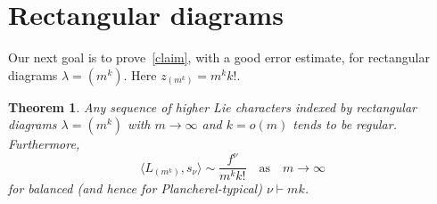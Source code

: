 \documentclass[12pt]%
{amsart}
\newcommand{\la}{{\lambda}}
\newcommand{\al}{{\alpha}}
\theoremstyle{plain}
\newtheorem{theorem}{Theorem}[section]
\theoremstyle{definition}
\theoremstyle{remark}
\newcommand{\todo}[1]{\vspace{5 mm}\par \noindent
	\marginpar{\textsc{ToDo}} \framebox{\begin{minipage}[c]{0.95
				\textwidth}
			#1 \end{minipage}}\vspace{5 mm}\par}
\begin{document}
\section{Rectangular diagrams}\label{sec:rectangular}


Our next goal is to prove~\eqref{claim}, with a good error estimate, for 
rectangular diagrams $\la = (m^k)$. 
Here $z_{(m^k)} = m^k k!$.

\begin{theorem}\label{thm:rectangular}
    Any sequence of higher Lie characters indexed by rectangular diagrams $\la=(m^k)$ with $m\to\infty$ and $k = o(m)$ tends to be regular. Furthermore,
    \begin{equation*}%
        \langle L_{(m^k)},s_\nu \rangle
        \sim \frac{f^\nu}{m^kk!} 
        \quad \text{as} \quad m \to \infty
    \end{equation*}
    for balanced (and hence for Plancherel-typical) $\nu \vdash mk$. 
    
\end{theorem}




\end{document}
